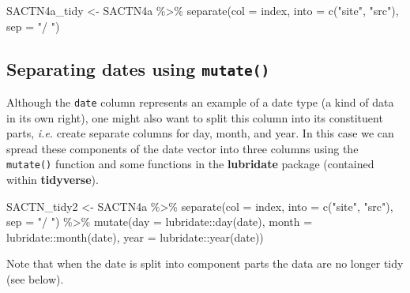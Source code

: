\documentclass[
]{book}
\newenvironment{Shaded}{\begin{snugshade}}{\end{snugshade}}
\newcommand{\AttributeTok}[1]{\textcolor[rgb]{0.77,0.63,0.00}{#1}}
\newcommand{\FunctionTok}[1]{\textcolor[rgb]{0.00,0.00,0.00}{#1}}
\newcommand{\NormalTok}[1]{#1}
\newcommand{\OtherTok}[1]{\textcolor[rgb]{0.56,0.35,0.01}{#1}}
\newcommand{\SpecialCharTok}[1]{\textcolor[rgb]{0.00,0.00,0.00}{#1}}
\newcommand{\StringTok}[1]{\textcolor[rgb]{0.31,0.60,0.02}{#1}}
\begin{document}
\begin{Shaded}
\begin{Highlighting}[]
\NormalTok{SACTN4a\_tidy }\OtherTok{\textless{}{-}}\NormalTok{ SACTN4a }\SpecialCharTok{\%\textgreater{}\%} 
  \FunctionTok{separate}\NormalTok{(}\AttributeTok{col =}\NormalTok{ index, }\AttributeTok{into =} \FunctionTok{c}\NormalTok{(}\StringTok{"site"}\NormalTok{, }\StringTok{"src"}\NormalTok{), }\AttributeTok{sep =} \StringTok{"/ "}\NormalTok{)}
\end{Highlighting}
\end{Shaded}

\hypertarget{separating-dates-using-mutate}{%
\subsection{\texorpdfstring{Separating dates using \texttt{mutate()}}{Separating dates using mutate()}}\label{separating-dates-using-mutate}}

Although the \texttt{date} column represents an example of a date type (a kind of data in its own right), one might also want to split this column into its constituent parts, \emph{i.e.} create separate columns for day, month, and year. In this case we can spread these components of the date vector into three columns using the \texttt{mutate()} function and some functions in the \textbf{lubridate} package (contained within \textbf{tidyverse}).

\begin{Shaded}
\begin{Highlighting}[]
\NormalTok{SACTN\_tidy2 }\OtherTok{\textless{}{-}}\NormalTok{ SACTN4a }\SpecialCharTok{\%\textgreater{}\%} 
  \FunctionTok{separate}\NormalTok{(}\AttributeTok{col =}\NormalTok{ index, }\AttributeTok{into =} \FunctionTok{c}\NormalTok{(}\StringTok{"site"}\NormalTok{, }\StringTok{"src"}\NormalTok{), }\AttributeTok{sep =} \StringTok{"/ "}\NormalTok{) }\SpecialCharTok{\%\textgreater{}\%} 
  \FunctionTok{mutate}\NormalTok{(}\AttributeTok{day =}\NormalTok{ lubridate}\SpecialCharTok{::}\FunctionTok{day}\NormalTok{(date),}
         \AttributeTok{month =}\NormalTok{ lubridate}\SpecialCharTok{::}\FunctionTok{month}\NormalTok{(date),}
         \AttributeTok{year =}\NormalTok{ lubridate}\SpecialCharTok{::}\FunctionTok{year}\NormalTok{(date))}
\end{Highlighting}
\end{Shaded}

Note that when the date is split into component parts the data are no longer tidy (see below).
\end{document}
